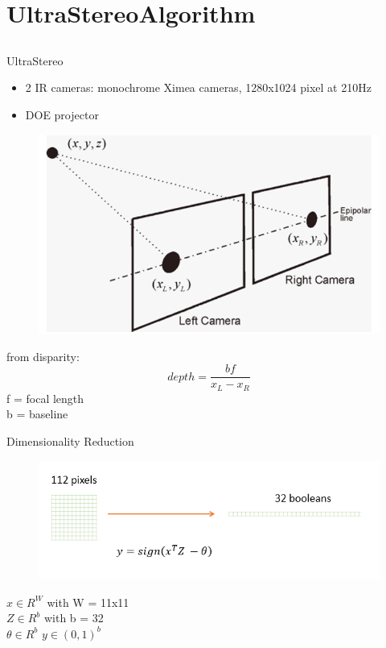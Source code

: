 %
%
\section{UltraStereoAlgorithm}
\subsection{}

\begin{frame}{UltraStereo}
\begin{itemize}
\item 2 IR cameras: monochrome Ximea cameras, 1280x1024 pixel at 210Hz
\item DOE projector
\end{itemize}
\end{frame}

\begin{frame}
\begin{figure}
\includegraphics[scale=0.5]{pictures/disp}
\end{figure}
from disparity:
$$depth = \frac{bf}{x_{L}- x_{R}}$$
f = focal length\\
b = baseline
\end{frame}

\begin{frame}{Dimensionality Reduction}
\begin{figure}
\includegraphics[scale=0.6]{pictures/patches}
\end{figure}
$ x \in R^{W} $  with W = 11x11\\
$ Z \in R^{b} $ with b = 32\\
$ \theta \in R^b$
$ y \in (0,1)^{b}$
\end{frame}

